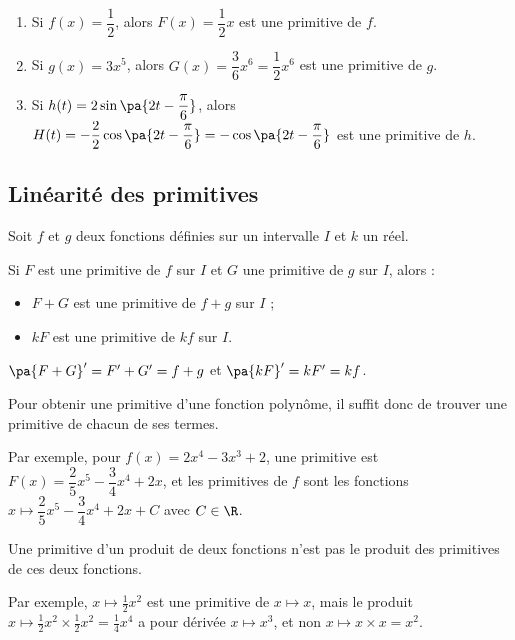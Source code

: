 \begin{ex}
	\nline
	\begin{enumerate}
		\item Si $f(x) = \dfrac{1}{2}$, alors $F(x) = \dfrac{1}{2}x$ est une primitive de $f$.
		\item Si $g(x) = 3x^5$, alors $G(x) = \dfrac{3}{6}x^6 = \dfrac{1}{2}x^6$ est une primitive de $g$.
		\item Si $h(t) = 2\sin\pa{2t - \dfrac{\pi}{6}}$, alors $H(t) = -\dfrac{2}{2}\cos\pa{2t - \dfrac{\pi}{6}} = -\cos\pa{2t - \dfrac{\pi}{6}}$ est une primitive de $h$.
	\end{enumerate}
\end{ex}

\subsection{Linéarité des primitives}

\begin{prop}
	Soit $f$ et $g$ deux fonctions définies sur un intervalle $I$ et $k$ un réel.

	Si $F$ est une primitive de $f$ sur $I$ et $G$ une primitive de $g$ sur $I$, alors :

	\begin{itemize}
		\item $F + G$ est une primitive de $f + g$ sur $I$ ;
		\item $kF$ est une primitive de $kf$ sur $I$.
	\end{itemize}
\end{prop}

\begin{demo}
	$\pa{F + G}' = F' + G' = f + g$ et $\pa{kF}' = kF' = kf$.
\end{demo}

\begin{rem}
	Pour obtenir une primitive d'une fonction polynôme, il suffit donc de trouver une primitive de chacun de ses termes.

	Par exemple, pour $f(x) = 2x^4 - 3x^3 + 2$, une primitive est $F(x) = \dfrac{2}{5}x^5 - \dfrac{3}{4}x^4 + 2x$, et les primitives de $f$ sont les fonctions $x \mapsto \dfrac{2}{5}x^5 - \dfrac{3}{4}x^4 + 2x + C$ avec $C \in \R$.
\end{rem}

\begin{attention}
	Une primitive d'un produit de deux fonctions n'est pas le produit des primitives de ces deux fonctions.

	Par exemple, $x \mapsto \tfrac{1}{2}x^2$ est une primitive de $x \mapsto x$, mais le produit $x \mapsto \tfrac{1}{2}x^2 \times \tfrac{1}{2}x^2 = \tfrac{1}{4}x^4$ a pour dérivée $x \mapsto x^3$, et non $x \mapsto x \times x = x^2$.
\end{attention}

